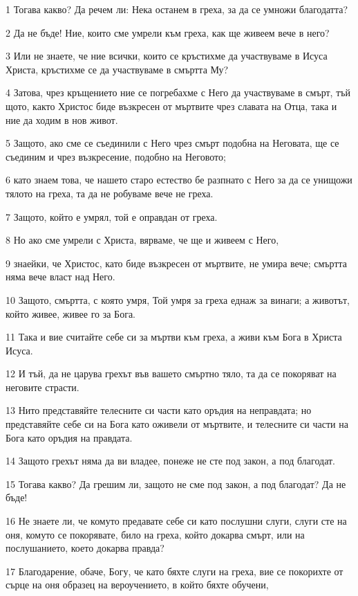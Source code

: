 \par 1 Тогава какво? Да речем ли: Нека останем в греха, за да се умножи благодатта?
\par 2 Да не бъде! Ние, които сме умрели към греха, как ще живеем вече в него?
\par 3 Или не знаете, че ние всички, които се кръстихме да участвуваме в Исуса Христа, кръстихме се да участвуваме в смъртта Му?
\par 4 Затова, чрез кръщението ние се погребахме с Него да участвуваме в смърт, тъй щото, както Христос биде възкресен от мъртвите чрез славата на Отца, така и ние да ходим в нов живот.
\par 5 Защото, ако сме се съединили с Него чрез смърт подобна на Неговата, ще се съединим и чрез възкресение, подобно на Неговото;
\par 6 като знаем това, че нашето старо естество бе разпнато с Него за да се унищожи тялото на греха, та да не робуваме вече не греха.
\par 7 Защото, който е умрял, той е оправдан от греха.
\par 8 Но ако сме умрели с Христа, вярваме, че ще и живеем с Него,
\par 9 знаейки, че Христос, като биде възкресен от мъртвите, не умира вече; смъртта няма вече власт над Него.
\par 10 Защото, смъртта, с която умря, Той умря за греха еднаж за винаги; а животът, който живее, живее го за Бога.
\par 11 Така и вие считайте себе си за мъртви към греха, а живи към Бога в Христа Исуса.
\par 12 И тъй, да не царува грехът във вашето смъртно тяло, та да се покоряват на неговите страсти.
\par 13 Нито представяйте телесните си части като оръдия на неправдата; но представяйте себе си на Бога като оживели от мъртвите, и телесните си части на Бога като оръдия на правдата.
\par 14 Защото грехът няма да ви владее, понеже не сте под закон, а под благодат.
\par 15 Тогава какво? Да грешим ли, защото не сме под закон, а под благодат? Да не бъде!
\par 16 Не знаете ли, че комуто предавате себе си като послушни слуги, слуги сте на оня, комуто се покорявате, било на греха, който докарва смърт, или на послушанието, което докарва правда?
\par 17 Благодарение, обаче, Богу, че като бяхте слуги на греха, вие се покорихте от сърце на оня образец на вероучението, в който бяхте обучени,
